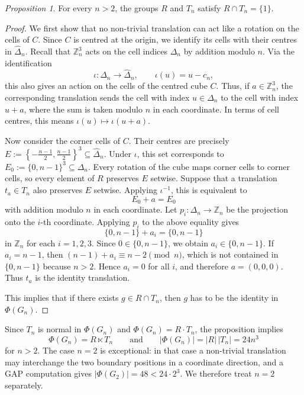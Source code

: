 \documentclass[12pt]{article}
\theoremstyle{definition}
\theoremstyle{remark}
\newtheorem{proposition}[theorem]{Proposition}
\begin{document}
\begin{proposition}
For every $n>2$, the groups $R$ and $T_n$ satisfy $R\cap T_n=\{1\}$.
\end{proposition}
\begin{proof}

We first show that no non-trivial translation can act like a rotation on the cells of $C$. Since $C$ is centred at the origin, we identify its cells with their centres in $\widehat{\Delta}_n$. Recall that $\mathbb Z_n^3$ acts on the cell indices $\Delta_n$ by addition modulo $n$. Via the identification
\[
\iota:\Delta_n\to\widehat{\Delta}_n,\qquad \iota(u)=u-c_n,
\]
this also gives an action on the cells of the centred cube $C$. Thus, if $a\in\mathbb Z_n^3$, the corresponding translation sends the cell with index $u\in \Delta_n$ to the cell with index $u+a$, where the sum is taken modulo $n$ in each coordinate. In terms of cell centres, this means
$\iota(u)\mapsto \iota(u+a).$

Now consider the corner cells of $C$. Their centres are precisely
$E:=\left\{-\frac{n-1}{2},\frac{n-1}{2}\right\}^3\subseteq \widehat{\Delta}_n.$
Under $\iota$, this set corresponds to
$
E_0:=\{0,n-1\}^3\subseteq\Delta_n.$
Every rotation of the cube maps corner cells to corner cells, so every element of $R$ preserves $E$ setwise. Suppose that a translation $t_a\in T_n$ also preserves $E$ setwise. Applying $\iota^{-1}$, this is equivalent to
\[
E_0+a=E_0
\]
with addition modulo $n$ in each coordinate. Let $p_i:\Delta_n\to \mathbb{Z}_n$ be the projection onto the $i$-th coordinate. Applying $p_i$ to the above equality gives
\[
\{0,n-1\}+a_i=\{0,n-1\}
\]
in $\mathbb{Z}_n$
for each $i=1,2,3$. Since $0\in \{0,n-1\}$, we obtain $a_i\in \{0,n-1\}$. If $a_i=n-1$, then $(n-1)+a_i\equiv n-2\pmod n$, which is not contained in $\{0,n-1\}$ because $n>2$. Hence $a_i=0$ for all $i$, and therefore $a=(0,0,0)$. Thus $t_a$ is the identity translation.

This implies that if there exists $g\in R\cap T_n$, then $g$ has to be the identity in $\Phi(G_n).$

\end{proof}

Since $T_n$ is normal in $\Phi(G_n)$ and $\Phi(G_n)=R\cdot T_n$, the proposition implies
\[
\Phi(G_n)=R\ltimes T_n
\qquad\text{and}\qquad
|\Phi(G_n)|=|R|\,|T_n|=24n^3
\]
for $n>2$. The case $n=2$ is exceptional: in that case a non-trivial translation may interchange the two boundary positions in a coordinate direction, and a GAP computation gives $|\Phi(G_2)|=48<24\cdot 2^3$. We therefore treat $n=2$ separately.
\end{document}
